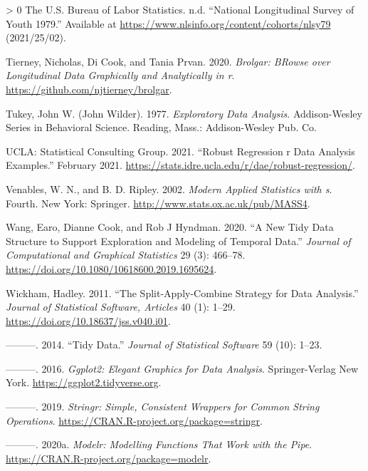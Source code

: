 \documentclass[12pt]{article}
\newlength{\cslhangindent}
\newenvironment{CSLReferences}[3] %
 {%
  \setlength{\parindent}{0pt}
  \ifodd #1 \everypar{\setlength{\hangindent}{\cslhangindent}}\ignorespaces\fi
  \ifnum #2 > 0
  \setlength{\parskip}{#2\baselineskip}
  \fi
 }%
 {}
\begin{document}
\begin{CSLReferences}{1}{0}
\leavevmode\hypertarget{ref-nlsy79}{}%
The U.S. Bureau of Labor Statistics. n.d. {``National Longitudinal Survey of Youth 1979.''} Available at \url{https://www.nlsinfo.org/content/cohorts/nlsy79} (2021/25/02).

\leavevmode\hypertarget{ref-brolgar}{}%
Tierney, Nicholas, Di Cook, and Tania Prvan. 2020. \emph{Brolgar: BRowse over Longitudinal Data Graphically and Analytically in r}. \url{https://github.com/njtierney/brolgar}.

\leavevmode\hypertarget{ref-tukey}{}%
Tukey, John W. (John Wilder). 1977. \emph{Exploratory Data Analysis}. Addison-Wesley Series in Behavioral Science. Reading, Mass.: Addison-Wesley Pub. Co.

\leavevmode\hypertarget{ref-rlm}{}%
UCLA: Statistical Consulting Group. 2021. {``Robust Regression \textbar{} r Data Analysis Examples.''} February 2021. \url{https://stats.idre.ucla.edu/r/dae/robust-regression/}.

\leavevmode\hypertarget{ref-mass}{}%
Venables, W. N., and B. D. Ripley. 2002. \emph{Modern Applied Statistics with s}. Fourth. New York: Springer. \url{http://www.stats.ox.ac.uk/pub/MASS4}.

\leavevmode\hypertarget{ref-tsibble}{}%
Wang, Earo, Dianne Cook, and Rob J Hyndman. 2020. {``A New Tidy Data Structure to Support Exploration and Modeling of Temporal Data.''} \emph{Journal of Computational and Graphical Statistics} 29 (3): 466--78. \url{https://doi.org/10.1080/10618600.2019.1695624}.

\leavevmode\hypertarget{ref-plyr}{}%
Wickham, Hadley. 2011. {``The Split-Apply-Combine Strategy for Data Analysis.''} \emph{Journal of Statistical Software, Articles} 40 (1): 1--29. \url{https://doi.org/10.18637/jss.v040.i01}.

\leavevmode\hypertarget{ref-WickhamHadley2014TD}{}%
---------. 2014. {``Tidy Data.''} \emph{Journal of Statistical Software} 59 (10): 1--23.

\leavevmode\hypertarget{ref-ggplot2}{}%
---------. 2016. \emph{Ggplot2: Elegant Graphics for Data Analysis}. Springer-Verlag New York. \url{https://ggplot2.tidyverse.org}.

\leavevmode\hypertarget{ref-stringr}{}%
---------. 2019. \emph{Stringr: Simple, Consistent Wrappers for Common String Operations}. \url{https://CRAN.R-project.org/package=stringr}.

\leavevmode\hypertarget{ref-modelr}{}%
---------. 2020a. \emph{Modelr: Modelling Functions That Work with the Pipe}. \url{https://CRAN.R-project.org/package=modelr}.


\end{CSLReferences}
\end{document}
